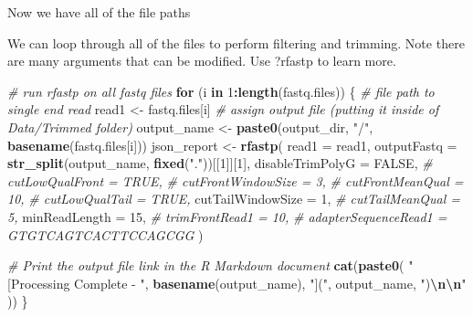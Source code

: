 \documentclass[
]{book}
\newenvironment{Shaded}{\begin{snugshade}}{\end{snugshade}}
\newcommand{\AttributeTok}[1]{\textcolor[rgb]{0.13,0.29,0.53}{#1}}
\newcommand{\CommentTok}[1]{\textcolor[rgb]{0.56,0.35,0.01}{\textit{#1}}}
\newcommand{\ConstantTok}[1]{\textcolor[rgb]{0.56,0.35,0.01}{#1}}
\newcommand{\ControlFlowTok}[1]{\textcolor[rgb]{0.13,0.29,0.53}{\textbf{#1}}}
\newcommand{\DecValTok}[1]{\textcolor[rgb]{0.00,0.00,0.81}{#1}}
\newcommand{\FunctionTok}[1]{\textcolor[rgb]{0.13,0.29,0.53}{\textbf{#1}}}
\newcommand{\NormalTok}[1]{#1}
\newcommand{\OtherTok}[1]{\textcolor[rgb]{0.56,0.35,0.01}{#1}}
\newcommand{\SpecialCharTok}[1]{\textcolor[rgb]{0.81,0.36,0.00}{\textbf{#1}}}
\newcommand{\StringTok}[1]{\textcolor[rgb]{0.31,0.60,0.02}{#1}}
\begin{document}
Now we have all of the file paths

We can loop through all of the files to perform filtering and trimming. Note there are many arguments that can be modified. Use ?rfastp to learn more.

\begin{Shaded}
\begin{Highlighting}[]
\CommentTok{\# run rfastp on all fastq files}
\ControlFlowTok{for}\NormalTok{ (i }\ControlFlowTok{in} \DecValTok{1}\SpecialCharTok{:}\FunctionTok{length}\NormalTok{(fastq.files)) \{}
  \CommentTok{\# file path to single end read}
\NormalTok{  read1 }\OtherTok{\textless{}{-}}\NormalTok{ fastq.files[i]}
  \CommentTok{\# assign output file (putting it inside of Data/Trimmed folder)}
\NormalTok{  output\_name }\OtherTok{\textless{}{-}} \FunctionTok{paste0}\NormalTok{(output\_dir,}
                        \StringTok{"/"}\NormalTok{,}
                        \FunctionTok{basename}\NormalTok{(fastq.files[i]))}
\NormalTok{  json\_report }\OtherTok{\textless{}{-}} \FunctionTok{rfastp}\NormalTok{(}
    \AttributeTok{read1 =}\NormalTok{ read1,}
    \AttributeTok{outputFastq =} \FunctionTok{str\_split}\NormalTok{(output\_name, }\FunctionTok{fixed}\NormalTok{(}\StringTok{"."}\NormalTok{))[[}\DecValTok{1}\NormalTok{]][}\DecValTok{1}\NormalTok{],}
    \AttributeTok{disableTrimPolyG =} \ConstantTok{FALSE}\NormalTok{,}
    \CommentTok{\# cutLowQualFront = TRUE,}
    \CommentTok{\# cutFrontWindowSize = 3,}
    \CommentTok{\# cutFrontMeanQual = 10,}
    \CommentTok{\# cutLowQualTail = TRUE,}
    \AttributeTok{cutTailWindowSize =} \DecValTok{1}\NormalTok{,}
    \CommentTok{\# cutTailMeanQual = 5,}
    \AttributeTok{minReadLength =} \DecValTok{15}\NormalTok{,}
    \CommentTok{\# trimFrontRead1 = 10,}
    \CommentTok{\# adapterSequenceRead1 = \textquotesingle{}GTGTCAGTCACTTCCAGCGG\textquotesingle{}}
\NormalTok{  )}
  
  \CommentTok{\# Print the output file link in the R Markdown document}
  \FunctionTok{cat}\NormalTok{(}\FunctionTok{paste0}\NormalTok{(}
    \StringTok{"[Processing Complete {-} "}\NormalTok{,}
    \FunctionTok{basename}\NormalTok{(output\_name),}
    \StringTok{"]("}\NormalTok{,}
\NormalTok{    output\_name,}
    \StringTok{")}\SpecialCharTok{\textbackslash{}n\textbackslash{}n}\StringTok{"}
\NormalTok{  ))}
\NormalTok{\}}
\end{Highlighting}
\end{Shaded}
\end{document}
